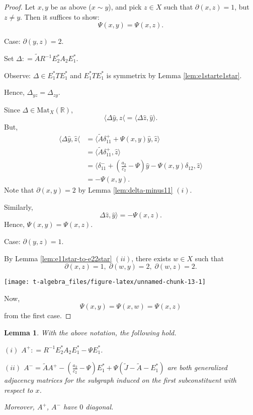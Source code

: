 \documentclass[
]{book}
\newtheorem{lemma}{Lemma}[chapter]
\theoremstyle{definition}
\theoremstyle{definition}
\theoremstyle{definition}
\theoremstyle{definition}
\theoremstyle{remark}
\begin{document}
\begin{proof}
Let \(x,y\) be as above (\(x\sim y\)), and pick \(z\in X\) such that \(\partial(x,z) = 1\), but \(z\neq y\). Then it suffices to show:
\[\Psi(x,y) = \Psi(x,z).\]

Case: \(\partial(y,z) = 2\).

Set \(\Delta: = \tilde{A}R^{-1}E^*_2A_2E^*_1\).

Observe: \(\Delta \in E^*_1TE^*_1\) and \(E^*_1TE^*_1\) is symmetrix by Lemma \ref{lem:e1starte1star}.

Hence, \(\Delta_{yz} = \Delta_{zy}\).

Since \(\Delta\in \mathrm{Mat}_X(\mathbb{R})\),
\[\langle \Delta\hat{y}, \hat{z}\langle = \langle \Delta \hat{z}, \hat{y}\rangle.\]
But,
\begin{align}
\langle \Delta\hat{y}, \hat{z}\langle & = \langle \tilde{A}\delta^+_{11} + \Psi(x,y)\hat{y}, \hat{z}\rangle \\
& = \langle \tilde{A}\delta^+_{11}, \hat{z}\rangle\\
& = \langle \delta^-_{11} + \left(\frac{a_2}{c_2}-\Psi\right)\hat{y} - \Psi(x,y)\delta_{12}, \hat{z}\rangle\\
& = -\Psi(x,y).
\end{align}
Note that \(\partial(x,y) = 2\) by Lemma \ref{lem:delta-minus11} \((i)\).

Similarly,
\[\Delta\hat{z}, \hat{y}\rangle = -\Psi(x,z).\]
Hence, \(\Psi(x,y) = \Psi(x,z)\).

Case: \(\partial(y,z) = 1\).

By Lemma \ref{lem:e11star-to-e22star} \((ii)\), there exists \(w\in X\) such that
\[\partial(x,z) = 1, \; \partial(w,y)=2, \; \partial(w,z)=2.\]

\begin{center}\texttt{[image: t-algebra\_files/figure-latex/unnamed-chunk-13-1]} \end{center}

Now,
\[\Psi(x,y) = \Psi(x,w) = \Psi(x,z)\]
from the first case.
\end{proof}

\begin{lemma}
\protect\hypertarget{lem:aplus-aminus}{}\label{lem:aplus-aminus}With the above notation, the following hold.

\((i)\) \(A^+: = R^{-1}E^*_2A_2E^*_1 - \Psi E^*_1\).

\((ii)\) \(A^- = \tilde{A}A^+ - \left(\frac{a_2}{c_2}-\Psi\right)E^*_1 + \Psi(\tilde{J} - \tilde{A} - E^*_1)\) are both generalized adjacency matrices for the subgraph induced on the first subconstituent with respect to \(x\).

Moreover, \(A^+\), \(A^-\) have \(0\) diagonal.
\end{lemma}
\end{document}
